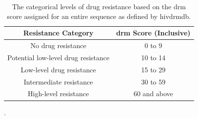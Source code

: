 \begin{table}[h]
    \centering %
    \begin{tabular}{||c|c||}
        \hline
        Resistance Category & \Ac{drm} Score (Inclusive) \\
        \hline
        \hline
        No drug resistance & 0 to 9 \\
        \hline
        Potential low-level drug resistance & 10 to 14 \\
        \hline
        Low-level drug resistance & 15 to 29 \\
        \hline
        Intermediate resistance & 30 to 59 \\
        \hline
        High-level resistance & 60 and above \\
        \hline
    \end{tabular}
    \caption{The categorical levels of drug resistance based on the \ac{drm} score assigned for an entire sequence as defined by \ac{hivdrmdb}.}.
    \label{table:hivdrmdb_categorizations}
\end{table}